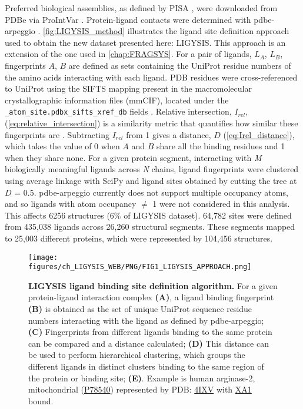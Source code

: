 Preferred biological assemblies, as defined by PISA \cite{KRISSINEL_2007_PISA}, were downloaded from PDBe via ProIntVar \cite{MACGOWAN_2020_DRSASP}. Protein-ligand contacts were determined with pdbe-arpeggio \cite{JUBB_2017_ARPEGGIO}. \autoref{fig:LIGYSIS_method} illustrates the ligand site definition approach used to obtain the new dataset presented here: LIGYSIS. This approach is an extension of the one used in \autoref{chap:FRAGSYS}. For a pair of ligands, $L_A$, $L_B$, fingerprints $A$, $B$ are defined as sets containing the UniProt residue numbers of the amino acids interacting with each ligand. PDB residues were cross-referenced to UniProt using the SIFTS mapping present in the macromolecular crystallographic information files (mmCIF), located under the \texttt{\_atom\_site.pdbx\_si\discretionary{-}{}{}fts\_xref\_db} fields \cite{VELANKAR_2012_SIFTS, DANA_2018_SIFTS}. Relative intersection, $I_{rel}$, (\autoref{eq:relative_intersection}) is a similarity metric that quantifies how similar these fingerprints are \cite{UTGES_2024_FRAGSYS}. Subtracting $I_{rel}$ from 1 gives a distance, $D$ (\autoref{eq:Irel_distance}), which takes the value of 0 when $A$ and $B$ share all the binding residues and 1 when they share none. For a given protein segment, interacting with \textit{M} biologically meaningful ligands across \textit{N} chains, ligand fingerprints were clustered using average linkage with SciPy \cite{VIRTANEN_2020_SCIPY} and ligand sites obtained by cutting the tree at $D$ = 0.5. pdbe-arpeggio currently does not support multiple occupancy atoms, and so ligands with atom occupancy $\neq$ 1 were not considered in this analysis. This affects 6256 structures (6\% of LIGYSIS dataset). 64,782 sites were defined from 435,038 ligands across 26,260 structural segments. These segments mapped to 25,003 different proteins, which were represented by 104,456 structures.

\begin{figure}[htb!]
    \centering
    \texttt{[image: figures/ch\_LIGYSIS\_WEB/PNG/FIG1\_LIGYSIS\_APPROACH.png]}
    \caption[LIGYSIS ligand binding site definition algorithm]{\textbf{LIGYSIS ligand binding site definition algorithm.} For a given protein-ligand interaction complex \textbf{(A)}, a ligand binding fingerprint \textbf{(B)} is obtained as the set of unique UniProt sequence residue numbers interacting with the ligand as defined by pdbe-arpeggio; \textbf{(C)} Fingerprints from different ligands binding to the same protein can be compared and a distance calculated; \textbf{(D)} This distance can be used to perform hierarchical clustering, which groups the different ligands in distinct clusters binding to the same region of the protein or binding site; \textbf{(E)}. Example is human arginase-2, mitochondrial (\href{https://www.uniprot.org/uniprotkb/P78540/entry}{P78540}) represented by PDB: \href{https://www.ebi.ac.uk/pdbe/entry/pdb/4ixv}{4IXV} \cite{GOLEBIOWSKI_2013_ARGINASE} with \href{https://www.ebi.ac.uk/pdbe-srv/pdbechem/chemicalCompound/show/XA1}{XA1} bound.}
    \label{fig:LIGYSIS_method}
\end{figure}

